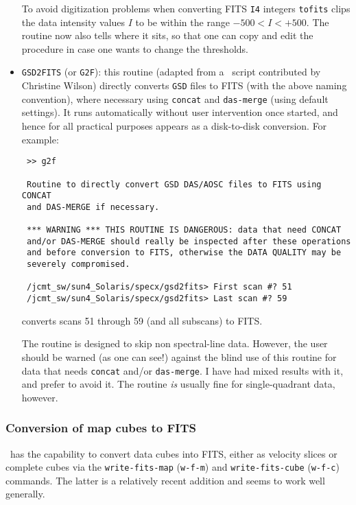 \begin{itemize}
To avoid digitization problems when converting FITS {\tt I4} integers
{\tt tofits} clips the data intensity values $I$ to be within the
range $-500 < I < +500$. The routine now also tells where it sits, so
that one can copy and edit the procedure in case one wants to change
the thresholds.

\item
{\tt GSD2FITS} (or {\tt G2F}): this routine (adapted from a \SPECX\
script contributed by Christine Wilson) directly converts {\tt GSD}
files to FITS (with the above naming convention), where necessary
using {\tt concat} and {\tt das-merge} (using default settings). It
runs automatically without user intervention once started, and hence
for all practical purposes appears as a disk-to-disk conversion.  For
example:

\begin{verbatim}
 >> g2f 
 
 Routine to directly convert GSD DAS/AOSC files to FITS using CONCAT
 and DAS-MERGE if necessary.
 
 *** WARNING *** THIS ROUTINE IS DANGEROUS: data that need CONCAT
 and/or DAS-MERGE should really be inspected after these operations
 and before conversion to FITS, otherwise the DATA QUALITY may be
 severely compromised.
 
 /jcmt_sw/sun4_Solaris/specx/gsd2fits> First scan #? 51
 /jcmt_sw/sun4_Solaris/specx/gsd2fits> Last scan #? 59

\end{verbatim}

converts scans 51 through 59 (and all subscans) to FITS.

The routine is designed to skip non spectral-line data. However, the
user should be warned (as one can see!) against the blind use of this
routine for data that needs {\tt concat} and/or {\tt das-merge}. I
have had mixed results with it, and prefer to avoid it. The
routine {\it is} usually fine for single-quadrant data, however.
\end{itemize}

\subsubsection{Conversion of map cubes to FITS}
\label{sec:specxmaps2fits}
\SPECX\ has the capability to convert data cubes into FITS, either as
velocity slices or complete cubes via the {\tt write-fits-map}
({\tt{w-f-m}}) and {\tt write-fits-cube} ({\tt{w-f-c}}) commands. The
latter is a relatively recent addition and seems to work well
generally.

